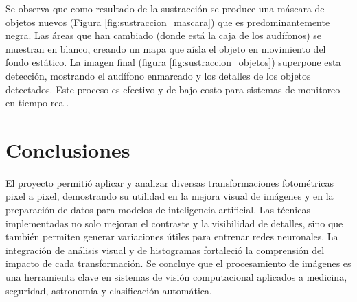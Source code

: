 \documentclass[12pt,letterpaper]{article}
\begin{document}
Se observa que como resultado de la sustracción se produce una máscara de objetos nuevos (Figura \ref{fig:sustraccion_mascara}) que es predominantemente negra. Las áreas que han cambiado (donde está la caja de los audífonos) se muestran en blanco, creando un mapa que aísla el objeto en movimiento del fondo estático. La imagen final (figura \ref{fig:sustraccion_objetos}) superpone esta detección, mostrando el audífono enmarcado y los detalles de los objetos detectados. Este proceso es efectivo y de bajo costo para sistemas de monitoreo en tiempo real.

\newpage

\section{Conclusiones}

El proyecto permitió aplicar y analizar diversas transformaciones fotométricas pixel a pixel, demostrando su utilidad en la mejora visual de imágenes y en la preparación de datos para modelos de inteligencia artificial. Las técnicas implementadas no solo mejoran el contraste y la visibilidad de detalles, sino que también permiten generar variaciones útiles para entrenar redes neuronales. La integración de análisis visual y de histogramas fortaleció la comprensión del impacto de cada transformación. Se concluye que el procesamiento de imágenes es una herramienta clave en sistemas de visión computacional aplicados a medicina, seguridad, astronomía y clasificación automática. 

\newpage
\end{document}
